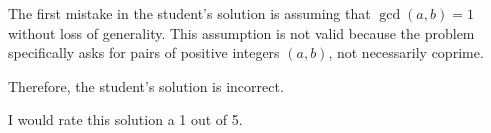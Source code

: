 The first mistake in the student's solution is assuming that $\gcd(a,b)=1$ without loss of generality. This assumption is not valid because the problem specifically asks for pairs of positive integers $(a,b)$, not necessarily coprime. 

Therefore, the student's solution is incorrect. 

I would rate this solution a 1 out of 5.
